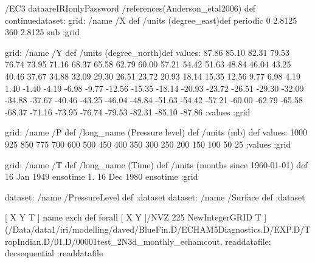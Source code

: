 \begin{ingrid}
/EC3 dataareIRIonlyPassword
/references(Anderson_etal2006) def
continuedataset:
grid:
/name /X def
/units (degree_east)def
 periodic
 0 2.8125 360  2.8125 sub
:grid

grid:
/name /Y def
/units (degree_north)def
values:
87.86 85.10 82.31 79.53 76.74 73.95 71.16 68.37
 65.58 62.79 60.00 57.21 54.42 51.63 48.84 46.04 43.25 40.46
 37.67 34.88 32.09 29.30 26.51 23.72 20.93 18.14 15.35 12.56
 9.77  6.98  4.19  1.40   -1.40   -4.19   -6.98   -9.77  -12.56  -15.35
 -18.14  -20.93  -23.72  -26.51  -29.30  -32.09  -34.88  -37.67  -40.46  -43.25
 -46.04  -48.84  -51.63  -54.42  -57.21  -60.00  -62.79  -65.58  -68.37  -71.16
 -73.95  -76.74  -79.53  -82.31  -85.10  -87.86
:values
:grid

grid:
/name /P def
/long_name (Pressure level) def
/units (mb) def
values:
1000 925 850 775 700 600 500 450 400 350 300 250 200 150 100 50 25
:values
:grid

grid:
/name /T def
/long_name (Time) def
/units (months since 1960-01-01) def
16 Jan 1949 ensotime
1.
16 Dec 1980 ensotime
:grid

dataset: /name /PressureLevel def :dataset
dataset: /name /Surface def :dataset

[ X Y T ] { name exch def } forall
[ X Y |/NVZ 225 NewIntegerGRID T ]
(/Data/data1/iri/modelling/daved/BlueFin.D/ECHAM5Diagnostics.D/EXP.D/TropIndian.D/01.D/00001test_2N3d_monthly_echamcout.%
readdatafile:
decsequential
:readdatafile


\end{ingrid}

